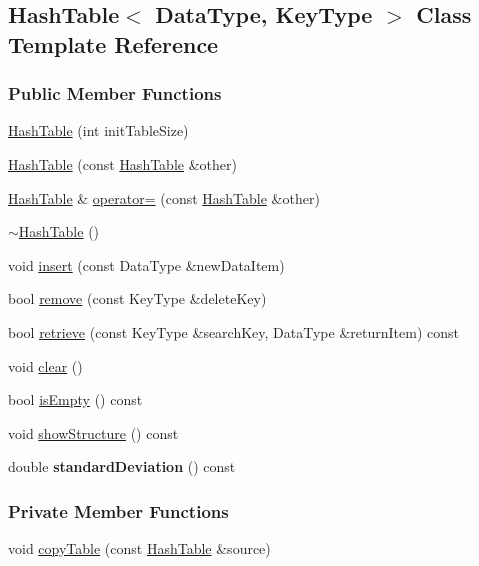 \hypertarget{class_hash_table}{}\subsection{Hash\+Table$<$ Data\+Type, Key\+Type $>$ Class Template Reference}
\label{class_hash_table}
\subsubsection*{Public Member Functions}
\begin{DoxyCompactItemize}
\item 
\hyperlink{class_hash_table_a103b09f30dbac0fe92fc2f1192feb0c1}{Hash\+Table} (int init\+Table\+Size)
\item 
\hyperlink{class_hash_table_a5da00f8a0dc9dc745675a96eac228049}{Hash\+Table} (const \hyperlink{class_hash_table}{Hash\+Table} \&other)
\item 
\hyperlink{class_hash_table}{Hash\+Table} \& \hyperlink{class_hash_table_add76a73a92b81a2d54c20078d4a76546}{operator=} (const \hyperlink{class_hash_table}{Hash\+Table} \&other)
\item 
\hyperlink{class_hash_table_ae25eb9c66b9bce8c9c04f18e22688a15}{$\sim$\+Hash\+Table} ()
\item 
void \hyperlink{class_hash_table_adc8f2be061729bdc5ecb171b54304e17}{insert} (const Data\+Type \&new\+Data\+Item)
\item 
bool \hyperlink{class_hash_table_a46d3f8ad70fd80dc7aa64f50676ef7a5}{remove} (const Key\+Type \&delete\+Key)
\item 
bool \hyperlink{class_hash_table_ad4ee3ff641daa330260a48de29492e66}{retrieve} (const Key\+Type \&search\+Key, Data\+Type \&return\+Item) const 
\item 
void \hyperlink{class_hash_table_a57f581334e35d45a8822c03edc0fcca6}{clear} ()
\item 
bool \hyperlink{class_hash_table_a101e211a7fca37cd90722e15df2fc571}{is\+Empty} () const 
\item 
void \hyperlink{class_hash_table_a8b875e57f71a5bbba394e42361fb9fb4}{show\+Structure} () const 
\item 
double {\bfseries standard\+Deviation} () const \hypertarget{class_hash_table_a4db2d920fd7c632f5b4b1bacd503bbf1}{}\label{class_hash_table_a4db2d920fd7c632f5b4b1bacd503bbf1}

\end{DoxyCompactItemize}
\subsubsection*{Private Member Functions}
\begin{DoxyCompactItemize}
\item 
void \hyperlink{class_hash_table_a300302ed45228f07c21ad8bf1d852fdd}{copy\+Table} (const \hyperlink{class_hash_table}{Hash\+Table} \&source)
\end{DoxyCompactItemize}
